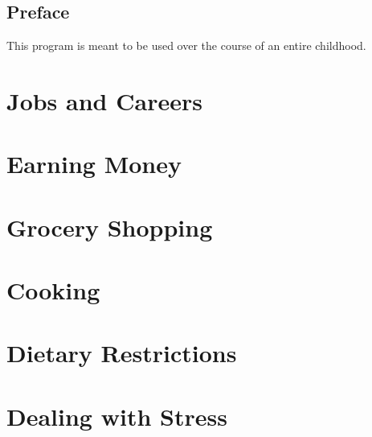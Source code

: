\documentclass[14pt,letterpaper,oneside]{book} %
\begin{document}
	
	\frontmatter
	
	
	
	\chapter*{Preface}
	This program is meant to be used over the course of an entire childhood.
	
	\newpage
	\tableofcontents
	
	\mainmatter
	
	\part{Jobs and Careers}
	
	
	\part{Earning Money}
	
	
	\part{Grocery Shopping}
	
	
	\part{Cooking}
	
	
	\part{Dietary Restrictions}
	
	
	\part{Dealing with Stress}
	
	
	
\end{document}
